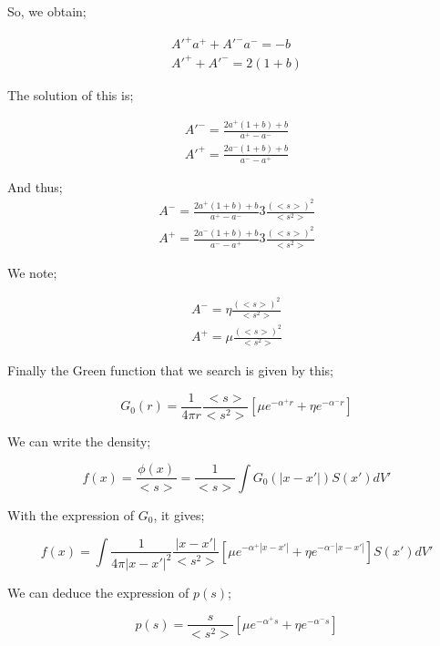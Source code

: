 \documentclass[preprint,12pt]{elsarticle}
\newcommand{\bl}{\big<}
\newcommand{\bg}{\big>}
\begin{document}
So, we obtain;

\begin{align}
A'^+a^+ + A'^-a^- =-b\\
A'^+ + A'^- = 2\left( 1 + b \right)
\end{align}

The solution of this is;

\begin{align}
A'^- = \frac{2a^+(1+b)+b}{a^+-a^-}\\
A'^+ = \frac{2a^-(1+b)+b}{a^--a^+}
\end{align}

And thus;
\begin{align}
A^- = \frac{2a^+(1+b)+b}{a^+-a^-} 3\frac{\left({\bl s \bg}\right)^2}{{{\bl s^2 \bg}}}\\
A^+ = \frac{2a^-(1+b)+b}{a^--a^+} 3\frac{\left({\bl s \bg}\right)^2}{{{\bl s^2 \bg}}}
\end{align}

We note;

\begin{align}
A^- = \eta\frac{\left({\bl s \bg}\right)^2}{{{\bl s^2 \bg}}}\\
A^+ = \mu\frac{\left({\bl s \bg}\right)^2}{{{\bl s^2 \bg}}}
\end{align}

Finally the Green function that we search is given by this;

\begin{equation}
G_0(r) = \frac{1}{4\pi r} \frac{{\bl s \bg}}{{{\bl s^2 \bg}}} \left[\mu e^{-\alpha^+ r} + \eta e^{-\alpha^- r} \right]
\end{equation}

We can write the density;

\begin{equation}
f(x) = \frac{\phi(x)}{{\bl s \bg}} = \frac{1}{{\bl s \bg}} \int G_0(|x-x'|) S(x') dV' 
\end{equation}

With the expression of $G_0$, it gives;

\begin{equation}
f(x) = \int \frac{1}{4\pi |x-x'|^2} \frac{|x-x'|}{{{\bl s^2 \bg}}} \left[\mu e^{-\alpha^+ |x-x'|} + \eta e^{-\alpha^- |x-x'|} \right]  S(x') dV' 
\end{equation}

We can deduce the expression of $p(s)$;

\begin{equation}
p(s) = \frac{s}{{{\bl s^2 \bg}}} \left[\mu e^{-\alpha^+ s} + \eta e^{-\alpha^- s}\right]
\end{equation}
\end{document}
